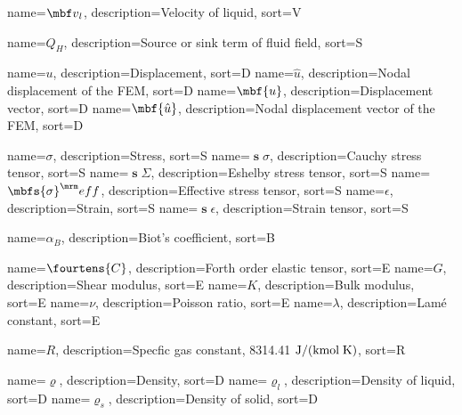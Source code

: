 %
{%
  name={\ensuremath{{\vel}_l}},
  description={Velocity of liquid},
  sort={V}
}

%
{%
  name={\ensuremath{Q_H}},
  description={Source or sink term of fluid field},
  sort={S}
}


%
{%
  name={\ensuremath{u}},
  description={Displacement},
  sort={D}
}
%
{%
  name={\ensuremath{\hat{u}}},
  description={Nodal displacement of  the FEM},
  sort={D}
}
%
{%
  name={\ensuremath{\mbf{u}}},
  description={Displacement vector},
  sort={D}
}
%
{%
  name={\ensuremath{\mbf{\hat{u}}}},
  description={Nodal displacement vector of the FEM},
  sort={D}
}

%
{%
  name={\ensuremath{\sigma}},
  description={Stress},
  sort={S}
}
%
{%
  name={\ensuremath{\mbfs{\sigma}}},
  description={Cauchy stress tensor},
  sort={S}
}
%
{%
  name={\ensuremath{\mbfs{\Sigma}}},
  description={Eshelby stress tensor},
  sort={S}
}
%
{%
  name={\ensuremath{\mbfs{\sigma}^\eff}},
  description={Effective stress tensor},
  sort={S}
}
%
{%
  name={\ensuremath{\epsilon}},
  description={Strain},
  sort={S}
}
%
{%
  name={\ensuremath{\mbfs{\epsilon}}},
  description={Strain tensor},
  sort={S}
}

%
{%
  name={\ensuremath{{\alpha}_B}},
  description={Biot's coefficient},
  sort={B}
}

%
{%
  name={\ensuremath{\fourtens{C}}},
  description={Forth order elastic tensor},
  sort={E}
}
%
{%
  name={\ensuremath{G}},
  description={Shear modulus},
  sort={E}
}
%
{%
  name={\ensuremath{K}},
  description={Bulk modulus},
  sort={E}
}
%
{%
  name={\ensuremath{\nu}},
  description={Poisson ratio},
  sort={E}
}
%
{%
  name={\ensuremath{\lambda}},
  description={Lam\'{e} constant},
  sort={E}
}

%
{%
  name={\ensuremath{R}},
  description={Specfic gas constant, 8314.41 $\mbox{J/(kmol\;K)}$},
  sort={R}
}


\newcommand{\dens}{\varrho}
%
{%
  name={\ensuremath{\dens}},
  description={Density},
  sort={D}
}
%
{%
  name={\ensuremath{\dens_l}},
  description={Density of liquid},
  sort={D}
}
%
{%
  name={\ensuremath{\dens_s}},
  description={Density of solid},
  sort={D}
}


